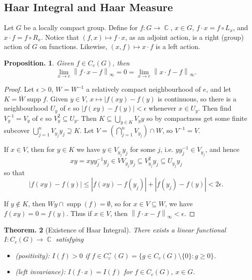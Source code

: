 \documentclass[11pt, a4paper]{memoir}
\DeclareMathOperator{\C}{{\mathbb{C}}}
\newcommand{\norm}[1]{\ensuremath{\left\lVert#1\right\rVert}}
\theoremstyle{change}
\newtheorem{theorem}{Theorem.}[section]
\newtheorem{proposition}[theorem]{Proposition.}
\theoremstyle{plain}
\theoremstyle{nonumberplain}
\newtheorem{proof}{Proof}
\DeclareMathOperator{\supp}{supp}
\newcommand{\defname}[1]{{\textit{(#1)}:}}
\numberwithin{equation}{section}
\begin{document}
\subsection{Haar Integral and Haar Measure}
Let $G$ be a locally compact group.
Define for $f:G\to\C$, $x\in G$, $f\cdot x=f\circ L_x$, and $x\cdot f=f\circ R_x$.
Notice that $(f,x)\mapsto f\cdot x$, as an adjoint action, is a right (group) action of $G$ on functions.
Likewise, $(x,f)\mapsto x\cdot f$ is a left action.
\begin{proposition}
    Given $f\in C_c(G)$, then
    \begin{equation*}
        \lim_{x\to e}\norm{f\cdot x-f}_\infty=0=\lim_{x\to e}\norm{x\cdot f-f}_\infty.
    \end{equation*}
\end{proposition}
\begin{proof}
    Let $\epsilon>0$, $W=W^{-1}$ a relatively compact neighbourhood of $e$, and let $K=\overline{W}\supp f$.
    Given $y\in V$, $x\mapsto|f(xy)-f(y)$ is continuous, so there is a neighbourhood $U_y$ of $e$ so $|f(xy)-f(y)|<\epsilon$ whenever $x\in U_y$.
    Then find $V_y^{-1}=V_y$ of $e$ so $V_y^2\subseteq U_y$.
    Then $K\subseteq\bigcup_{y\in K}V_yy$ so by compactness get some finite subcover $\bigcup_{j=1}^n V_{y_j}y_j\supseteq K$.
    Let $V=\left(\bigcap_{j=1}^n V_{y_j}\right)\cap W$, so $V^{-1}=V$.

    If $x\in V$, then for $y\in K$ we have $y\in V_{y_j}y_j$ for some $j$, i.e. $yy_j^{-1}\in V_{y_j}$, and hence
    \begin{equation*}
        xy=xyy_j^{-1}y_j\in VV_{y_j}y_j\subseteq V_{y_j}^2y_j\subseteq U_{y_j}y_j
    \end{equation*}
    so that
    \begin{equation*}
        |f(xy)-f(y)|\leq|f(xy)-f(y_j)|+|f(y_j)-f(y)|<2\epsilon.
    \end{equation*}

    If $y\notin K$, then $Wy\cap\supp(f)=\emptyset$, so for $x\in V\subseteq W$, we have $f(xy)=0=f(y)$.
    Thus if $x\in V$, then $\norm{f\cdot x-f}_\infty<\epsilon$.
\end{proof}
\begin{theorem}[Existence of Haar Integral]
    There exists a linear functional $I:C_c(G)\to\C$ satisfying
    \begin{itemize}[nl]
        \item \defname{positivity} $I(f)>0$ if $f\in C_c^+(G)=\{g\in C_c(G)\setminus\{0\}:g\geq 0\}$.
        \item \defname{left invariance} $I(f\cdot x)=I(f)$ for $f\in C_c(G)$, $x\in G$.
    \end{itemize}
\end{theorem}
\end{document}
